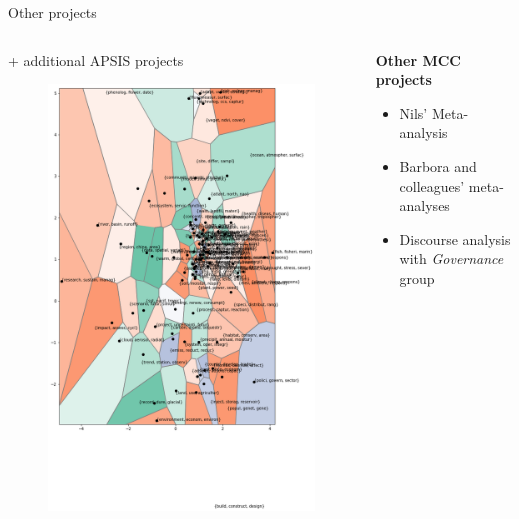 \documentclass[9pt]{beamer}
\begin{document}
\begin{frame}[t]{Other projects}
\begin{columns}[t]
\begin{column}{0.33\linewidth}
		+ additional APSIS projects
		\citep{Lamb2017,Minx2017}
		\begin{figure}
			\includegraphics[width=\linewidth]{images/pca_map}
		\end{figure}
	\end{column}
	\begin{column}{0.33\linewidth}
	\centering \textbf{ Other MCC projects }
	\begin{itemize}
		\item Nils' Meta-analysis
		\item Barbora and colleagues' meta-analyses
		\item Discourse analysis with \textit{Governance} group
	\end{itemize}
	\end{column}	
\end{columns}

\end{frame}
\end{document}
